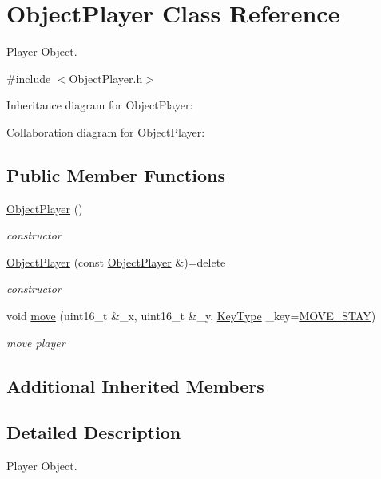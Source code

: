 \hypertarget{class_object_player}{\section{Object\+Player Class Reference}
\label{class_object_player}
}


Player Object.  




{\ttfamily \#include $<$Object\+Player.\+h$>$}



Inheritance diagram for Object\+Player\+:


Collaboration diagram for Object\+Player\+:
\subsection*{Public Member Functions}
\begin{DoxyCompactItemize}
\item 
\hyperlink{class_object_player_a0c11aba8b099bf12e0e764bcfb8d2a77}{Object\+Player} ()
\begin{DoxyCompactList}\small\item\em constructor \end{DoxyCompactList}\item 
\hyperlink{class_object_player_a6a1884056337dc2e019ca8c2bb059b3d}{Object\+Player} (const \hyperlink{class_object_player}{Object\+Player} \&)=delete
\begin{DoxyCompactList}\small\item\em constructor \end{DoxyCompactList}\item 
void \hyperlink{class_object_player_a108d685bbb392d7dca63790d03fc336a}{move} (uint16\+\_\+t \&\+\_\+x, uint16\+\_\+t \&\+\_\+y, \hyperlink{_i_key_type_8h_aab0feaba617470cb4aa830dc5935238c}{Key\+Type} \+\_\+key=\hyperlink{_object_agent_8h_a00ec4eba48da32d6cbdf827185fd3d34a2a255050085b4deedc187c2d8be54d5a}{M\+O\+V\+E\+\_\+\+S\+T\+A\+Y})
\begin{DoxyCompactList}\small\item\em move player \end{DoxyCompactList}\end{DoxyCompactItemize}
\subsection*{Additional Inherited Members}


\subsection{Detailed Description}
Player Object. 

